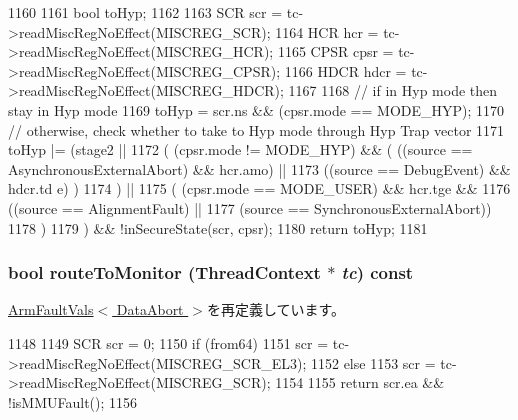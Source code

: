 \begin{DoxyCode}
1160 {
1161     bool toHyp;
1162 
1163     SCR  scr  = tc->readMiscRegNoEffect(MISCREG_SCR);
1164     HCR  hcr  = tc->readMiscRegNoEffect(MISCREG_HCR);
1165     CPSR cpsr = tc->readMiscRegNoEffect(MISCREG_CPSR);
1166     HDCR hdcr = tc->readMiscRegNoEffect(MISCREG_HDCR);
1167 
1168     // if in Hyp mode then stay in Hyp mode
1169     toHyp  = scr.ns && (cpsr.mode == MODE_HYP);
1170     // otherwise, check whether to take to Hyp mode through Hyp Trap vector
1171     toHyp |= (stage2 ||
1172                 ( (cpsr.mode != MODE_HYP) && ( ((source == 
      AsynchronousExternalAbort) && hcr.amo) ||
1173                                                ((source == DebugEvent) && hdcr.td
      e) )
1174                 ) ||
1175                 ( (cpsr.mode == MODE_USER) && hcr.tge &&
1176                   ((source == AlignmentFault)            ||
1177                    (source == SynchronousExternalAbort))
1178                 )
1179              ) && !inSecureState(scr, cpsr);
1180     return toHyp;
1181 }
\end{DoxyCode}
\hypertarget{classArmISA_1_1DataAbort_afd7a21fdb010230ad53094254739dde8}{
\subsubsection[{routeToMonitor}]{\setlength{\rightskip}{0pt plus 5cm}bool routeToMonitor ({\bf ThreadContext} $\ast$ {\em tc}) const}}
\label{classArmISA_1_1DataAbort_afd7a21fdb010230ad53094254739dde8}


\hyperlink{classArmISA_1_1ArmFaultVals_a9a0a467b98f43890c1d89d1d59a5923c}{ArmFaultVals$<$ DataAbort $>$}を再定義しています。


\begin{DoxyCode}
1148 {
1149     SCR scr = 0;
1150     if (from64)
1151         scr = tc->readMiscRegNoEffect(MISCREG_SCR_EL3);
1152     else
1153         scr = tc->readMiscRegNoEffect(MISCREG_SCR);
1154 
1155     return scr.ea && !isMMUFault();
1156 }
\end{DoxyCode}


